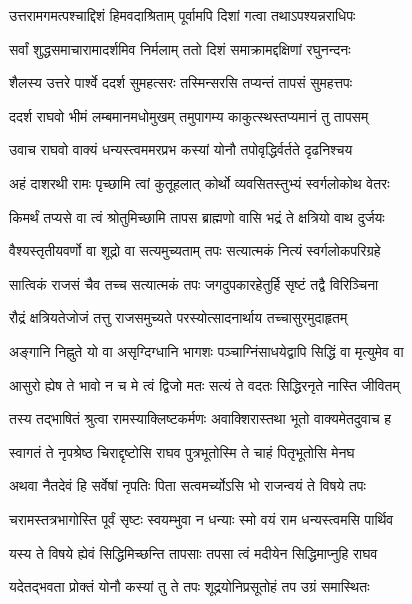 \twolineshloka
{उत्तरामगमत्पश्चाद्दिशं हिमवदाश्रिताम्}
{पूर्वामपि दिशां गत्वा तथाऽपश्यन्नराधिपः}%

\twolineshloka
{सर्वां शुद्धसमाचारामादर्शमिव निर्मलाम्}
{ततो दिशं समाक्रामद्दक्षिणां रघुनन्दनः}%

\twolineshloka
{शैलस्य उत्तरे पार्श्वे ददर्श सुमहत्सरः}
{तस्मिन्सरसि तप्यन्तं तापसं सुमहत्तपः}%

\twolineshloka
{ददर्श राघवो भीमं लम्बमानमधोमुखम्}
{तमुपागम्य काकुत्स्थस्तप्यमानं तु तापसम्}%

\twolineshloka
{उवाच राघवो वाक्यं धन्यस्त्वममरप्रभ}
{कस्यां योनौ तपोवृद्धिर्वर्तते दृढनिश्चय}%

\twolineshloka
{अहं दाशरथी रामः पृच्छामि त्वां कुतूहलात्}
{कोर्थो व्यवसितस्तुभ्यं स्वर्गलोकोथ वेतरः}%

\twolineshloka
{किमर्थं तप्यसे वा त्वं श्रोतुमिच्छामि तापस}
{ब्राह्मणो वासि भद्रं ते क्षत्रियो वाथ दुर्जयः}%

\twolineshloka
{वैश्यस्तृतीयवर्णो वा शूद्रो वा सत्यमुच्यताम्}
{तपः सत्यात्मकं नित्यं स्वर्गलोकपरिग्रहे}%

\twolineshloka
{सात्विकं राजसं चैव तच्च सत्यात्मकं तपः}
{जगदुपकारहेतुर्हि सृष्टं तद्वै विरिञ्चिना}%

\twolineshloka
{रौद्रं क्षत्रियतेजोजं तत्तु राजसमुच्यते}
{परस्योत्सादनार्थाय तच्चासुरमुदाहृतम्}%

\twolineshloka
{अङ्गानि निह्नुते यो वा असृग्दिग्धानि भागशः}
{पञ्चाग्निंसाधयेद्वापि सिद्धिं वा मृत्युमेव वा}%

\twolineshloka
{आसुरो ह्येष ते भावो न च मे त्वं द्विजो मतः}
{सत्यं ते वदतः सिद्धिरनृते नास्ति जीवितम्}%

\twolineshloka
{तस्य तद्भाषितं श्रुत्वा रामस्याक्लिष्टकर्मणः}
{अवाक्शिरास्तथा भूतो वाक्यमेतदुवाच ह}%

\twolineshloka
{स्वागतं ते नृपश्रेष्ठ चिराद्दृष्टोसि राघव}
{पुत्रभूतोस्मि ते चाहं पितृभूतोसि मेनघ}%

\twolineshloka
{अथवा नैतदेवं हि सर्वेषां नृपतिः पिता}
{सत्वमर्च्योऽसि भो राजन्वयं ते विषये तपः}%

\twolineshloka
{चरामस्तत्रभागोस्ति पूर्वं सृष्टः स्वयम्भुवा}
{न धन्याः स्मो वयं राम धन्यस्त्वमसि पार्थिव}%

\twolineshloka
{यस्य ते विषये ह्येवं सिद्धिमिच्छन्ति तापसाः}
{तपसा त्वं मदीयेन सिद्धिमाप्नुहि राघव}%

\twolineshloka
{यदेतद्भवता प्रोक्तं योनौ कस्यां तु ते तपः}
{शूद्रयोनिप्रसूतोहं तप उग्रं समास्थितः}%

